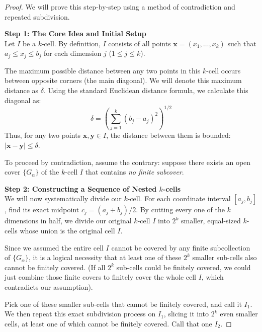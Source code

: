 \documentclass{article}
\theoremstyle{mythm}
\begin{document}
\begin{proof}
We will prove this step-by-step using a method of contradiction and repeated subdivision.

\textbf{Step 1: The Core Idea and Initial Setup} \\
Let $I$ be a $k$-cell. By definition, $I$ consists of all points $\mathbf{x} = (x_1, \dots, x_k)$ such that $a_j \le x_j \le b_j$ for each dimension $j$ ($1 \le j \le k$). 

The maximum possible distance between any two points in this $k$-cell occurs between opposite corners (the main diagonal). We will denote this maximum distance as $\delta$. Using the standard Euclidean distance formula, we calculate this diagonal as:
\[ \delta = \left( \sum_{j=1}^k (b_j - a_j)^2 \right)^{1/2} \]
Thus, for any two points $\mathbf{x}, \mathbf{y} \in I$, the distance between them is bounded: $|\mathbf{x} - \mathbf{y}| \le \delta$.

To proceed by contradiction, assume the contrary: suppose there exists an open cover $\{G_\alpha\}$ of the $k$-cell $I$ that contains \textit{no finite subcover}. 

\textbf{Step 2: Constructing a Sequence of Nested $k$-cells} \\
We will now systematically divide our $k$-cell. For each coordinate interval $[a_j, b_j]$, find its exact midpoint $c_j = (a_j + b_j)/2$. By cutting every one of the $k$ dimensions in half, we divide our original $k$-cell $I$ into $2^k$ smaller, equal-sized $k$-cells whose union is the original cell $I$.

Since we assumed the entire cell $I$ cannot be covered by any finite subcollection of $\{G_\alpha\}$, it is a logical necessity that at least one of these $2^k$ smaller sub-cells also cannot be finitely covered. (If all $2^k$ sub-cells could be finitely covered, we could just combine those finite covers to finitely cover the whole cell $I$, which contradicts our assumption). 

Pick one of these smaller sub-cells that cannot be finitely covered, and call it $I_1$. 
We then repeat this exact subdivision process on $I_1$, slicing it into $2^k$ even smaller cells, at least one of which cannot be finitely covered. Call that one $I_2$. 


\end{proof}
\end{document}

